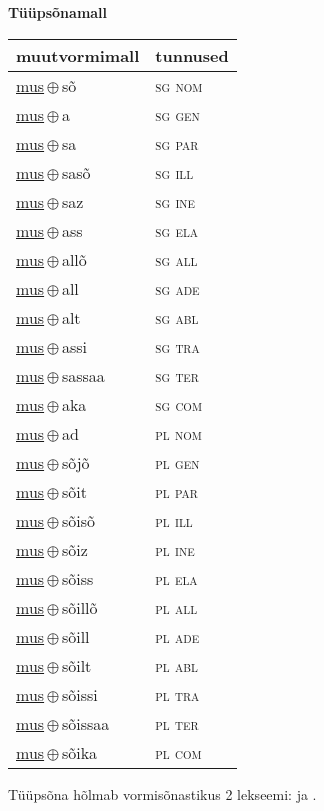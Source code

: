 

\vspace{3.5em}
\noindent \begin{minipage}{\textwidth}
\noindent \textbf{Tüüpsõnamall \,}\\

\begin{sideways}
\begin{tabular}{l l}
muutvormimall & tunnused \\
\hline
\underline{mus}\,$\oplus$\,sõ & \textsc{ sg nom } \\
\underline{mus}\,$\oplus$\,a & \textsc{ sg gen } \\
\underline{mus}\,$\oplus$\,sa & \textsc{ sg par } \\
\underline{mus}\,$\oplus$\,sasõ & \textsc{ sg ill } \\
\underline{mus}\,$\oplus$\,saz & \textsc{ sg ine } \\
\underline{mus}\,$\oplus$\,ass & \textsc{ sg ela } \\
\underline{mus}\,$\oplus$\,allõ & \textsc{ sg all } \\
\underline{mus}\,$\oplus$\,all & \textsc{ sg ade } \\
\underline{mus}\,$\oplus$\,alt & \textsc{ sg abl } \\
\underline{mus}\,$\oplus$\,assi & \textsc{ sg tra } \\
\underline{mus}\,$\oplus$\,sassaa & \textsc{ sg ter } \\
\underline{mus}\,$\oplus$\,aka & \textsc{ sg com } \\
\underline{mus}\,$\oplus$\,ad & \textsc{ pl nom } \\
\underline{mus}\,$\oplus$\,sõjõ & \textsc{ pl gen } \\
\underline{mus}\,$\oplus$\,sõit & \textsc{ pl par } \\
\underline{mus}\,$\oplus$\,sõisõ & \textsc{ pl ill } \\
\underline{mus}\,$\oplus$\,sõiz & \textsc{ pl ine } \\
\underline{mus}\,$\oplus$\,sõiss & \textsc{ pl ela } \\
\underline{mus}\,$\oplus$\,sõillõ & \textsc{ pl all } \\
\underline{mus}\,$\oplus$\,sõill & \textsc{ pl ade } \\
\underline{mus}\,$\oplus$\,sõilt & \textsc{ pl abl } \\
\underline{mus}\,$\oplus$\,sõissi & \textsc{ pl tra } \\
\underline{mus}\,$\oplus$\,sõissaa & \textsc{ pl ter } \\
\underline{mus}\,$\oplus$\,sõika & \textsc{ pl com } \\
\end{tabular}
\end{sideways}
\label{tab:tüüpsõnamall-mussõ}

\end{minipage}

 
\vspace{1em}
\noindent Tüüpsõna hõlmab vormisõnastikus 2 lekseemi:  ja .
